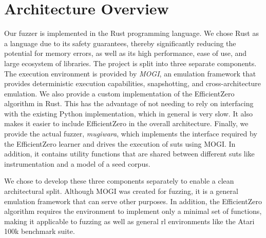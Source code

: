 
\section{Architecture Overview}\label{sec:impl-architecture}



Our fuzzer is implemented in the Rust programming language.
We chose Rust as a language due to its safety guarantees, thereby significantly
reducing the potential for memory errors, as well as its high performance, ease
of use, and large ecosystem of libraries.
The project is split into three separate components.
The execution environment is provided by \emph{MOGI}, an emulation framework that
provides deterministic execution capabilities, snapshotting, and cross-architecture emulation.
We also provide a custom implementation of the EfficientZero algorithm in Rust.
This has the advantage of not needing to rely on interfacing with the existing Python
implementation, which in general is very slow.
It also makes it easier to include EfficientZero in the overall architecture.
Finally, we provide the actual fuzzer, \emph{mugiwara}, which implements the interface
required by the EfficientZero learner and drives the execution of \glspl{sut} using MOGI.
In addition, it contains utility functions that are shared between different \glspl{sut}
like instrumentation and a model of a seed corpus.

We chose to develop these three components separately to enable a clean architectural
split.
Although MOGI was created for fuzzing, it is a general emulation framework
that can serve other purposes.
In addition, the EfficientZero algorithm requires the environment to
implement only a minimal set of functions, making it applicable to
fuzzing as well as general \gls{rl} environments like the Atari
100k benchmark suite.
